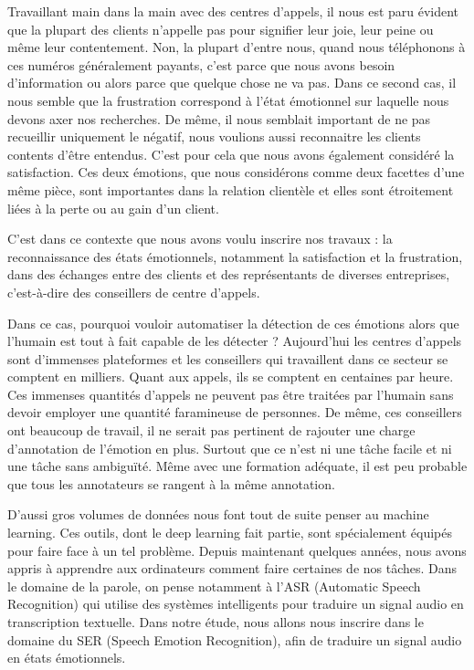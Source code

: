 Travaillant main dans la main avec des centres d'appels, il nous est paru évident que la plupart des clients n'appelle pas pour signifier leur joie, leur peine ou même leur contentement. Non, la plupart d'entre nous, quand nous téléphonons à ces numéros généralement payants, c'est parce que nous avons besoin d'information ou alors parce que quelque chose ne va pas. Dans ce second cas, il nous semble que la frustration correspond à l'état émotionnel sur laquelle nous devons axer nos recherches. De même, il nous semblait important de ne pas recueillir uniquement le négatif, nous voulions aussi reconnaitre les clients contents d'être entendus. C'est pour cela que nous avons également considéré la satisfaction. Ces deux émotions, que nous considérons comme deux facettes d'une même pièce, sont importantes dans la relation clientèle et elles sont étroitement liées à la perte ou au gain d'un client.

C'est dans ce contexte que nous avons voulu inscrire nos travaux : la reconnaissance des états émotionnels, notamment la satisfaction et la frustration, dans des échanges entre des clients et des représentants de diverses entreprises, c'est-à-dire des conseillers de centre d'appels.

Dans ce cas, pourquoi vouloir automatiser la détection de ces émotions alors que l'humain est tout à fait capable de les détecter ? Aujourd'hui les centres d'appels sont d'immenses plateformes et les conseillers qui travaillent dans ce secteur se comptent en milliers. Quant aux appels, ils se comptent en centaines par heure. Ces immenses quantités d'appels ne peuvent pas être traitées par l'humain sans devoir employer une quantité faramineuse de personnes. De même, ces conseillers ont beaucoup de travail, il ne serait pas pertinent de rajouter une charge d'annotation de l'émotion en plus. Surtout que ce n'est ni une tâche facile et ni une tâche sans ambiguïté. Même avec une formation adéquate, il est peu probable que tous les annotateurs se rangent à la même annotation.

D'aussi gros volumes de données nous font tout de suite penser au machine learning. Ces outils, dont le deep learning fait partie, sont spécialement équipés pour faire face à un tel problème. Depuis maintenant quelques années, nous avons appris à apprendre aux ordinateurs comment faire certaines de nos tâches. Dans le domaine de la parole, on pense notamment à l'ASR (Automatic Speech Recognition) qui utilise des systèmes intelligents pour traduire un signal audio en transcription textuelle. Dans notre étude, nous allons nous inscrire dans le domaine du SER (Speech Emotion Recognition), afin de traduire un signal audio en états émotionnels.

